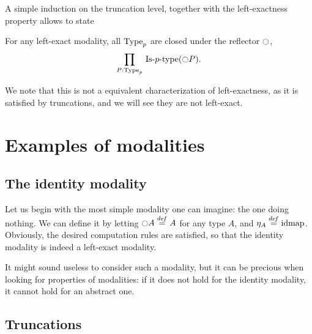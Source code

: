 A simple induction on the truncation level, together with the
left-exactness property allows to state
\begin{lem}\label{lem:mod-istrunc}
  For any left-exact modality, all $\operatorname{Type}_p$ are closed under the
  reflector $\ocircle$, \ie{}
  \[\prod_{P:\operatorname{Type}_p}\, \mathop{\mathrm{Is{\hbox{-}}}p\mathrm{{\hbox{-}} type}} (\ocircle P).\]
\end{lem}
We note that this is not a equivalent characterization of
left-exactness, as it is satisfied by truncations, and we will see
they are not left-exact.




\section{Examples of modalities}
\label{sec:modalities-examples}

\subsection{The identity modality}
\label{ssec:id_mod}

Let us begin with the most simple modality one can imagine: the one
doing nothing. We can define it by letting $\ocircle A \overset{de\hspace{-0.2ex}f}{=} A$ for any type
$A$, and $\eta_A \overset{de\hspace{-0.2ex}f}{=} \operatorname{\mathrm{idmap}}$. Obviously, the desired computation
rules are satisfied, so that the identity modality is indeed a
left-exact modality.

It might sound useless to consider such a modality, but it can be
precious when looking for properties of modalities: if it does not
hold for the identity modality, it cannot hold for an abstract one.


\subsection{Truncations}
\label{ssec:truncations}


